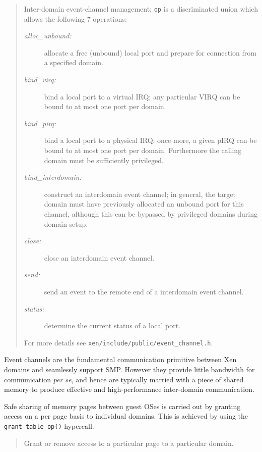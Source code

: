 \documentclass[11pt,twoside,final,openright]{report}
\begin{document}
\begin{quote}

Inter-domain event-channel management; {\tt op} is a discriminated 
union which allows the following 7 operations: 

\begin{description} 

\item[\it alloc\_unbound:] allocate a free (unbound) local
  port and prepare for connection from a specified domain. 
\item[\it bind\_virq:] bind a local port to a virtual 
IRQ; any particular VIRQ can be bound to at most one port per domain. 
\item[\it bind\_pirq:] bind a local port to a physical IRQ;
once more, a given pIRQ can be bound to at most one port per
domain. Furthermore the calling domain must be sufficiently
privileged.
\item[\it bind\_interdomain:] construct an interdomain event 
channel; in general, the target domain must have previously allocated 
an unbound port for this channel, although this can be bypassed by 
privileged domains during domain setup. 
\item[\it close:] close an interdomain event channel. 
\item[\it send:] send an event to the remote end of a 
interdomain event channel. 
\item[\it status:] determine the current status of a local port. 
\end{description} 

For more details see
{\tt xen/include/public/event\_channel.h}. 

\end{quote} 

Event channels are the fundamental communication primitive between 
Xen domains and seamlessly support SMP. However they provide little
bandwidth for communication {\sl per se}, and hence are typically 
married with a piece of shared memory to produce effective and 
high-performance inter-domain communication. 

Safe sharing of memory pages between guest OSes is carried out by
granting access on a per page basis to individual domains. This is
achieved by using the {\tt grant\_table\_op()} hypercall.

\begin{quote}

Grant or remove access to a particular page to a particular domain. 

\end{quote} 
\end{document}
